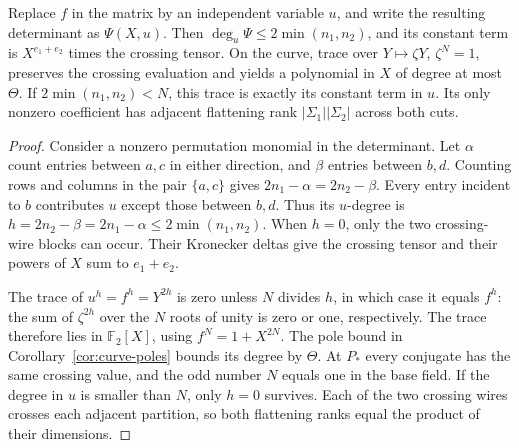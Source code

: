 \begin{proposition}\label{prop:curve-trace-collapse}
Replace $f$ in the matrix by an independent variable $u$, and write the resulting determinant as $\Psi(X,u)$. Then $\deg_u\Psi\leq2\min(n_1,n_2)$, and its constant term is $X^{e_1+e_2}$ times the crossing tensor. On the curve, trace over $Y\mapsto\zeta Y$, $\zeta^N=1$, preserves the crossing evaluation and yields a polynomial in $X$ of degree at most $\Theta$. If $2\min(n_1,n_2)<N$, this trace is exactly its constant term in $u$. Its only nonzero coefficient has adjacent flattening rank $|\Sigma_1||\Sigma_2|$ across both cuts.
\end{proposition}
\begin{proof}
Consider a nonzero permutation monomial in the determinant. Let $\alpha$ count entries between $a,c$ in either direction, and $\beta$ entries between $b,d$. Counting rows and columns in the pair $\{a,c\}$ gives
$2n_1-\alpha=2n_2-\beta$.
Every entry incident to $b$ contributes $u$ except those between $b,d$. Thus its $u$-degree is
$h=2n_2-\beta=2n_1-\alpha\leq2\min(n_1,n_2)$.
When $h=0$, only the two crossing-wire blocks can occur. Their Kronecker deltas give the crossing tensor and their powers of $X$ sum to $e_1+e_2$.

The trace of $u^h=f^h=Y^{2h}$ is zero unless $N$ divides $h$, in which case it equals $f^h$: the sum of $\zeta^{2h}$ over the $N$ roots of unity is zero or one, respectively. The trace therefore lies in $\mathbb F_2[X]$, using $f^N=1+X^{2N}$. The pole bound in Corollary~\ref{cor:curve-poles} bounds its degree by $\Theta$. At $P_*$ every conjugate has the same crossing value, and the odd number $N$ equals one in the base field. If the degree in $u$ is smaller than $N$, only $h=0$ survives. Each of the two crossing wires crosses each adjacent partition, so both flattening ranks equal the product of their dimensions.
\end{proof}

